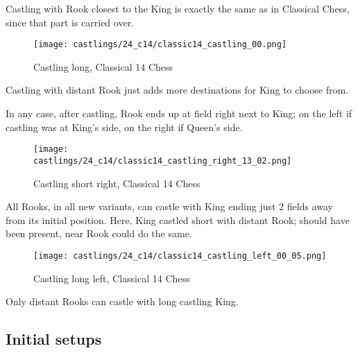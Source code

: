 Castling with Rook closest to the King is exactly the same as in Classical Chess,
since that part is carried over.

\noindent
\begin{figure}[!h]
\texttt{[image: castlings/24\_c14/classic14\_castling\_00.png]}
\vspace*{-1.4\baselineskip}
\caption{Castling long, Classical 14 Chess}
\label{fig:classic14_castling_00}
\end{figure}

Castling with distant Rook just adds more destinations for King to choose from.

\vfill{}

\clearpage %

In any case, after castling, Rook ends up at field right next to King; on the left
if castling was at King's side, on the right if Queen's side.

\noindent
\begin{figure}[!h]
\texttt{[image: castlings/24\_c14/classic14\_castling\_right\_13\_02.png]}
\vspace*{-1.4\baselineskip}
\caption{Castling short right, Classical 14 Chess}
\label{fig:classic14_castling_right_13_02}
\end{figure}

All Rooks, in all new variants, can castle with King ending just 2 fields away from
its initial position. Here, King castled short with distant Rook; should have been
present, near Rook could do the same.

\noindent
\begin{figure}[!h]
\texttt{[image: castlings/24\_c14/classic14\_castling\_left\_00\_05.png]}
\vspace*{-1.4\baselineskip}
\caption{Castling long left, Classical 14 Chess}
\label{fig:classic14_castling_left_00_05}
\end{figure}

Only distant Rooks can castle with long castling King.

\clearpage %

\subsection*{Initial setups}
\label{sec:Simple variants/Classical Chess variants/Initial setups}

